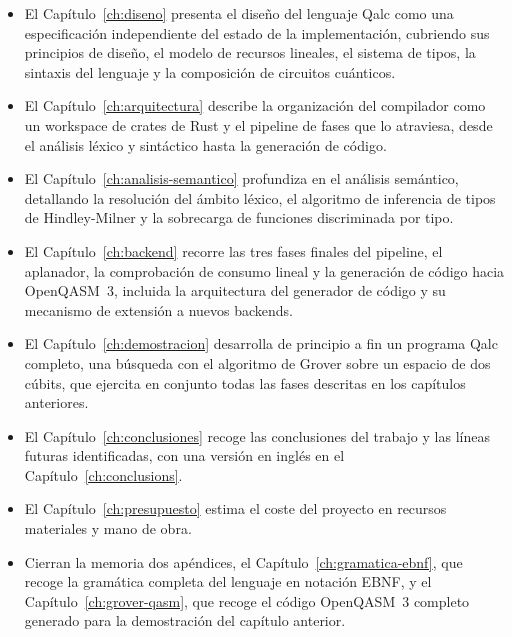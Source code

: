 \begin{itemize}
  \item El Capítulo~\ref{ch:diseno} presenta el diseño del lenguaje Qalc como una especificación independiente del estado de la implementación, cubriendo sus principios de diseño, el modelo de recursos lineales, el sistema de tipos, la sintaxis del lenguaje y la composición de circuitos cuánticos.

  \item El Capítulo~\ref{ch:arquitectura} describe la organización del compilador como un workspace de crates de Rust y el pipeline de fases que lo atraviesa, desde el análisis léxico y sintáctico hasta la generación de código.

  \item El Capítulo~\ref{ch:analisis-semantico} profundiza en el análisis semántico, detallando la resolución del ámbito léxico, el algoritmo de inferencia de tipos de Hindley-Milner y la sobrecarga de funciones discriminada por tipo.

  \item El Capítulo~\ref{ch:backend} recorre las tres fases finales del pipeline, el aplanador, la comprobación de consumo lineal y la generación de código hacia OpenQASM~3, incluida la arquitectura del generador de código y su mecanismo de extensión a nuevos backends.

  \item El Capítulo~\ref{ch:demostracion} desarrolla de principio a fin un programa Qalc completo, una búsqueda con el algoritmo de Grover sobre un espacio de dos cúbits, que ejercita en conjunto todas las fases descritas en los capítulos anteriores.

  \item El Capítulo~\ref{ch:conclusiones} recoge las conclusiones del trabajo y las líneas futuras identificadas, con una versión en inglés en el Capítulo~\ref{ch:conclusions}.

  \item El Capítulo~\ref{ch:presupuesto} estima el coste del proyecto en recursos materiales y mano de obra.

  \item Cierran la memoria dos apéndices, el Capítulo~\ref{ch:gramatica-ebnf}, que recoge la gramática completa del lenguaje en notación EBNF, y el Capítulo~\ref{ch:grover-qasm}, que recoge el código OpenQASM~3 completo generado para la demostración del capítulo anterior.
\end{itemize}